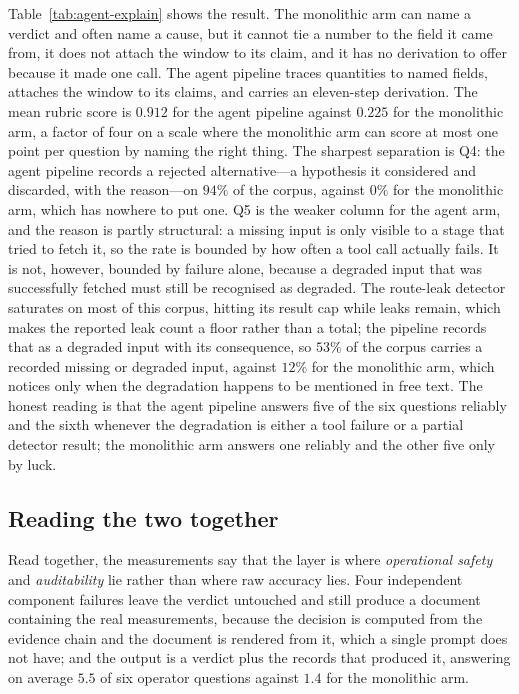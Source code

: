Table~\ref{tab:agent-explain} shows the result. The monolithic arm can
name a verdict and often name a cause, but it cannot tie a number to the
field it came from, it does not attach the window to its claim, and it has
no derivation to offer because it made one call. The agent pipeline traces
quantities to named fields, attaches the window to its claims, and carries
an eleven-step derivation. The mean rubric score is $0.912$ for the agent
pipeline against $0.225$ for the monolithic arm, a factor of four on a
scale where the monolithic arm can score at most one point per question by
naming the right thing. The sharpest separation is Q4: the agent pipeline
records a rejected alternative---a hypothesis it considered and discarded,
with the reason---on $94\%$ of the corpus, against $0\%$ for the
monolithic arm, which has nowhere to put one. Q5 is the weaker column for
the agent arm, and the reason is partly structural: a missing input is
only visible to a stage that tried to fetch it, so the rate is bounded by
how often a tool call actually fails. It is not, however, bounded by
failure alone, because a degraded input that was successfully fetched
must still be recognised as degraded. The route-leak detector saturates
on most of this corpus, hitting its result cap while leaks remain, which
makes the reported leak count a floor rather than a total; the pipeline
records that as a degraded input with its consequence, so $53\%$ of the
corpus carries a recorded missing or degraded input, against $12\%$ for
the monolithic arm, which notices only when the degradation happens to be
mentioned in free text. The honest reading is that the agent pipeline
answers five of the six questions reliably and the sixth whenever the
degradation is either a tool failure or a partial detector result; the
monolithic arm answers one reliably and the other five only by luck.

\subsection{Reading the two together}

Read together, the measurements say that the layer is where \emph{operational
safety} and \emph{auditability} lie rather than where raw accuracy lies.
Four independent component failures leave the verdict untouched and still
produce a document containing the real measurements, because the decision
is computed from the evidence chain and the document is rendered from it,
which a single prompt does not have; and the output is a verdict plus the
records that produced it, answering on average $5.5$ of six operator
questions against $1.4$ for the monolithic arm.

